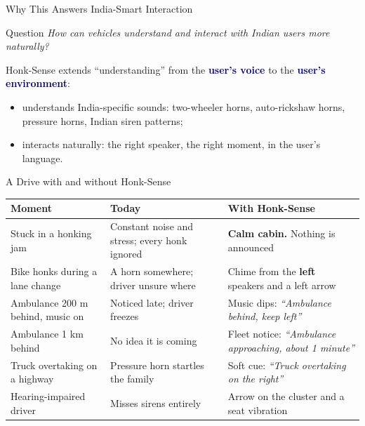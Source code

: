\documentclass[aspectratio=169,10pt,t,xcolor=table]{beamer}
\renewcommand{\arraystretch}{1.18}
\newcommand{\hl}[1]{\textcolor{navy}{\textbf{#1}}}
\begin{document}
\begin{frame}{Why This Answers India-Smart Interaction}
\begin{block}{Question}
\emph{How can vehicles understand and interact with Indian users more naturally?}
\end{block}
\vspace{6pt}
Honk-Sense extends ``understanding'' from the \hl{user's voice} to the \hl{user's environment}:
\begin{itemize}
  \item understands India-specific sounds: two-wheeler horns, auto-rickshaw horns, pressure horns, Indian siren patterns;
  \item interacts naturally: the right speaker, the right moment, in the user's language.
\end{itemize}
\vspace{10pt}
\end{frame}

\begin{frame}{A Drive with and without Honk-Sense}
\vspace{4pt}
\small\renewcommand{\arraystretch}{1.24}
\begin{tabularx}{\textwidth}{@{}p{3.6cm}YY@{}}
\toprule
\textbf{Moment} & \textbf{Today} & \textbf{With Honk-Sense} \\
\midrule
Stuck in a honking jam & Constant noise and stress; every honk ignored & \textcolor{ok}{\textbf{Calm cabin.}} Nothing is announced \\
Bike honks during a lane change & A horn somewhere; driver unsure where & Chime from the \textbf{left} speakers and a left arrow \\
Ambulance 200 m behind, music on & Noticed late; driver freezes & Music dips: \emph{``Ambulance behind, keep left''} \\
Ambulance 1 km behind & No idea it is coming & Fleet notice: \emph{``Ambulance approaching, about 1 minute''} \\
Truck overtaking on a highway & Pressure horn startles the family & Soft cue: \emph{``Truck overtaking on the right''} \\
Hearing-impaired driver & Misses sirens entirely & Arrow on the cluster and a seat vibration \\
\bottomrule
\end{tabularx}

\end{frame}
\end{document}
